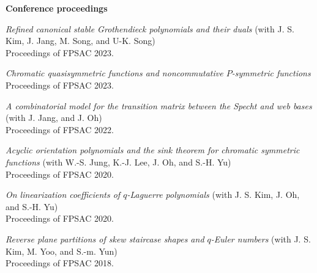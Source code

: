\documentclass[letterpaper,11pt]{article}
\begin{document}
{\bf Conference proceedings}
\begin{etaremune}
    \item \emph{Refined canonical stable Grothendieck polynomials and their duals} (with J. S. Kim, J. Jang, M. Song, and U-K. Song) \\
    Proceedings of FPSAC 2023.

    \item \emph{Chromatic quasisymmetric functions and noncommutative $P$-symmetric functions} \\ Proceedings of FPSAC 2023.

    \item \emph{A combinatorial model for the transition matrix between the Specht and web bases} (with J. Jang, and J. Oh) \\
    Proceedings of FPSAC 2022.
    
    \item \emph{Acyclic orientation polynomials and the sink theorem for chromatic symmetric functions} (with W.-S. Jung, K.-J. Lee, J. Oh, and S.-H. Yu) \\
    Proceedings of FPSAC 2020.
	
    \item  \emph{On linearization coefficients of $q$-Laguerre polynomials} (with J. S. Kim, J. Oh, and  S.-H. Yu) \\
    Proceedings of FPSAC 2020.
	
    \item \emph{Reverse plane partitions of skew staircase shapes and $q$-Euler numbers} (with J. S. Kim, M. Yoo, and S.-m. Yun) \\
    Proceedings of FPSAC 2018.
\end{etaremune}

\end{document}
